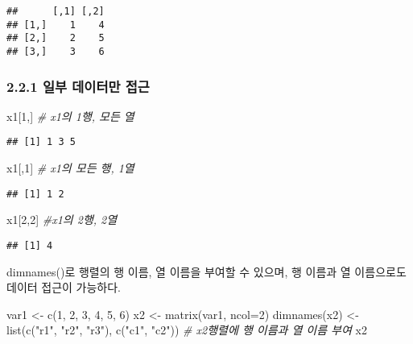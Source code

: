 \documentclass[
]{article}
\newenvironment{Shaded}{\begin{snugshade}}{\end{snugshade}}
\newcommand{\AttributeTok}[1]{\textcolor[rgb]{0.77,0.63,0.00}{#1}}
\newcommand{\CommentTok}[1]{\textcolor[rgb]{0.56,0.35,0.01}{\textit{#1}}}
\newcommand{\DecValTok}[1]{\textcolor[rgb]{0.00,0.00,0.81}{#1}}
\newcommand{\FunctionTok}[1]{\textcolor[rgb]{0.00,0.00,0.00}{#1}}
\newcommand{\NormalTok}[1]{#1}
\newcommand{\OtherTok}[1]{\textcolor[rgb]{0.56,0.35,0.01}{#1}}
\newcommand{\StringTok}[1]{\textcolor[rgb]{0.31,0.60,0.02}{#1}}
\begin{document}
\begin{verbatim}
##      [,1] [,2]
## [1,]    1    4
## [2,]    2    5
## [3,]    3    6
\end{verbatim}

\hypertarget{uxc77cuxbd80-uxb370uxc774uxd130uxb9cc-uxc811uxadfc-1}{%
\subsubsection{2.2.1 일부 데이터만
접근}\label{uxc77cuxbd80-uxb370uxc774uxd130uxb9cc-uxc811uxadfc-1}}

\begin{Shaded}
\begin{Highlighting}[]
\NormalTok{x1[}\DecValTok{1}\NormalTok{,]  }\CommentTok{\# x1의 1행, 모든 열}
\end{Highlighting}
\end{Shaded}

\begin{verbatim}
## [1] 1 3 5
\end{verbatim}

\begin{Shaded}
\begin{Highlighting}[]
\NormalTok{x1[,}\DecValTok{1}\NormalTok{]  }\CommentTok{\# x1의 모든 행, 1열}
\end{Highlighting}
\end{Shaded}

\begin{verbatim}
## [1] 1 2
\end{verbatim}

\begin{Shaded}
\begin{Highlighting}[]
\NormalTok{x1[}\DecValTok{2}\NormalTok{,}\DecValTok{2}\NormalTok{]  }\CommentTok{\#x1의 2행, 2열}
\end{Highlighting}
\end{Shaded}

\begin{verbatim}
## [1] 4
\end{verbatim}

dimnames()로 행렬의 행 이름, 열 이름을 부여할 수 있으며, 행 이름과 열
이름으로도 데이터 접근이 가능하다.

\begin{Shaded}
\begin{Highlighting}[]
\NormalTok{var1 }\OtherTok{\textless{}{-}} \FunctionTok{c}\NormalTok{(}\DecValTok{1}\NormalTok{, }\DecValTok{2}\NormalTok{, }\DecValTok{3}\NormalTok{, }\DecValTok{4}\NormalTok{, }\DecValTok{5}\NormalTok{, }\DecValTok{6}\NormalTok{)}
\NormalTok{x2 }\OtherTok{\textless{}{-}} \FunctionTok{matrix}\NormalTok{(var1, }\AttributeTok{ncol=}\DecValTok{2}\NormalTok{)}
\FunctionTok{dimnames}\NormalTok{(x2) }\OtherTok{\textless{}{-}} \FunctionTok{list}\NormalTok{(}\FunctionTok{c}\NormalTok{(}\StringTok{"r1"}\NormalTok{, }\StringTok{"r2"}\NormalTok{, }\StringTok{"r3"}\NormalTok{), }\FunctionTok{c}\NormalTok{(}\StringTok{"c1"}\NormalTok{, }\StringTok{"c2"}\NormalTok{))   }\CommentTok{\# x2행렬에 행 이름과 열 이름 부여}
\NormalTok{x2}
\end{Highlighting}
\end{Shaded}
\end{document}

